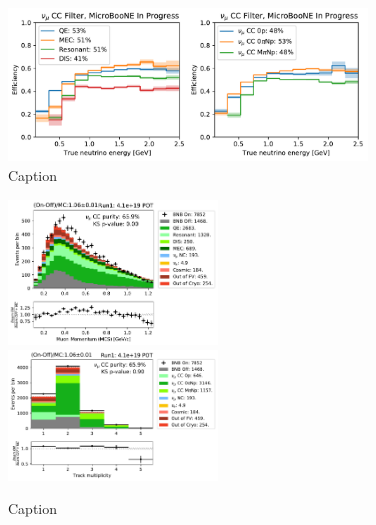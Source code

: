 \begin{figure}[H]
    \centering
    \includegraphics[width=0.85\textwidth]{NuMuCCsel/Images/run1/numu_efficiency_run1.pdf}
    \caption{Caption}
    \label{fig:numu_eff_r1}
\end{figure}

\begin{figure}[H]
    \centering
    \includegraphics[width=0.495\textwidth]{NuMuCCsel/Images/run1/numu_mcsmom_run1.pdf} \hfill
    \includegraphics[width=0.495\textwidth]{NuMuCCsel/Images/run1/numu_vtxntrack_cat_run1.pdf}
    \caption{Caption}
    \label{fig:numu_mcs}
\end{figure}

